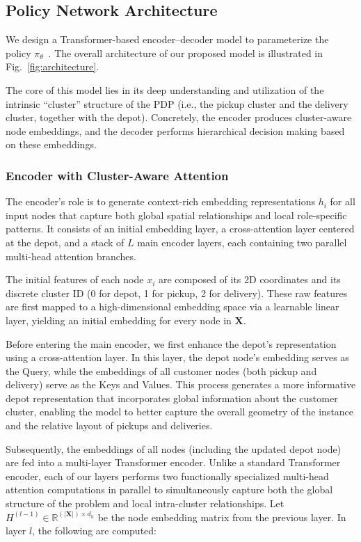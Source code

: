 \documentclass[pdflatex,sn-basic,Numbered]{sn-jnl}
\begin{document}
\subsection{Policy Network Architecture}
We design a Transformer-based encoder--decoder model to parameterize the policy $\pi_{\theta}$~\cite{kool2019attention}.
The overall architecture of our proposed model is illustrated in Fig.~\ref{fig:architecture}.

The core of this model lies in its deep understanding and utilization of the intrinsic ``cluster'' structure of the PDP (i.e., the pickup cluster and the delivery cluster, together with the depot). Concretely, the encoder produces cluster-aware node embeddings, and the decoder performs hierarchical decision making based on these embeddings.

\subsubsection{Encoder with Cluster-Aware Attention}
The encoder's role is to generate context-rich embedding representations $h_i$ for all input nodes that capture both global spatial relationships and local role-specific patterns. It consists of an initial embedding layer, a cross-attention layer centered at the depot, and a stack of $L$ main encoder layers, each containing two parallel multi-head attention branches.

The initial features of each node $x_i$ are composed of its 2D coordinates and its discrete cluster ID (0 for depot, 1 for pickup, 2 for delivery). These raw features are first mapped to a high-dimensional embedding space via a learnable linear layer, yielding an initial embedding for every node in $\mathbf{X}$.

Before entering the main encoder, we first enhance the depot's representation using a cross-attention layer. In this layer, the depot node's embedding serves as the Query, while the embeddings of all customer nodes (both pickup and delivery) serve as the Keys and Values. This process generates a more informative depot representation that incorporates global information about the customer cluster, enabling the model to better capture the overall geometry of the instance and the relative layout of pickups and deliveries.

Subsequently, the embeddings of all nodes (including the updated depot node) are fed into a multi-layer Transformer encoder. Unlike a standard Transformer encoder, each of our layers performs two functionally specialized multi-head attention computations in parallel to simultaneously capture both the global structure of the problem and local intra-cluster relationships. Let $H^{(l-1)} \in \mathbb{R}^{(|\mathbf{X}|) \times d_h}$ be the node embedding matrix from the previous layer. In layer $l$, the following are computed:
\end{document}
